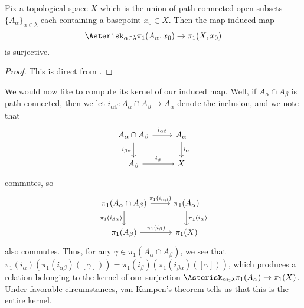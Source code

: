 \documentclass[../notes.tex]{subfiles}
\begin{document}
\begin{corollary}
	Fix a topological space $X$ which is the union of path-connected open subsets $\{A_\alpha\}_{\alpha\in\lambda}$ each containing a basepoint $x_0\in X$. Then the map induced map
	\[\Asterisk_{\alpha\in\lambda}\pi_1(A_\alpha,x_0)\to\pi_1(X,x_0)\]
	is surjective.
\end{corollary}
\begin{proof}
	This is direct from .
\end{proof}
We would now like to compute its kernel of our induced map. Well, if $A_\alpha\cap A_\beta$ is path-connected, then we let $i_{\alpha\beta}\colon A_\alpha\cap A_\beta\to A_\alpha$ denote the inclusion, and we note that
\[\begin{tikzcd}
	{A_\alpha\cap A_\beta} & {A_\alpha} \\
	{A_\beta} & X
	\arrow["{i_{\alpha\beta}}", from=1-1, to=1-2]
	\arrow["{i_{\beta\alpha}}"', from=1-1, to=2-1]
	\arrow["{i_\alpha}", from=1-2, to=2-2]
	\arrow["{i_\beta}", from=2-1, to=2-2]
\end{tikzcd}\]
commutes, so
\[\begin{tikzcd}
	{\pi_1(A_\alpha\cap A_\beta)} & {\pi_1(A_\alpha)} \\
	{\pi_1(A_\beta)} & {\pi_1(X)}
	\arrow["{\pi_1(i_{\alpha\beta})}", from=1-1, to=1-2]
	\arrow["{\pi_1(i_{\beta\alpha})}"', from=1-1, to=2-1]
	\arrow["{\pi_1(i_\alpha)}", from=1-2, to=2-2]
	\arrow["{\pi_1(i_\beta)}", from=2-1, to=2-2]
\end{tikzcd}\]
also commutes. Thus, for any $\gamma\in\pi_1(A_\alpha\cap A_\beta)$, we see that $\pi_1(i_\alpha)(\pi_1(i_{\alpha\beta})([\gamma]))=\pi_1(i_\beta)(\pi_1(i_{\beta\alpha})([\gamma]))$, which produces a relation belonging to the kernel of our surjection $\Asterisk_{\alpha\in\lambda}\pi_1(A_\alpha)\to\pi_1(X)$. Under favorable circumstances, van Kampen's theorem tells us that this is the entire kernel.
\end{document}
